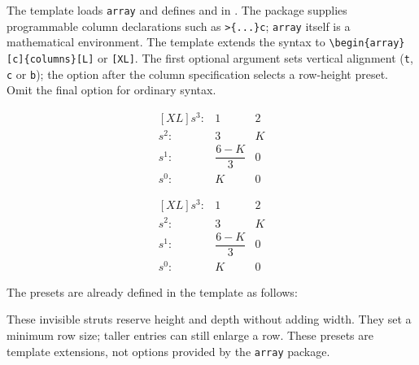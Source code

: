 \begin{referencecode}
\usepackage{uc3m-report}
\end{referencecode}
The template loads \texttt{array} and defines \texttt{\string\rowL}
and \texttt{\string\rowXL} in
. The package supplies
programmable column declarations such as \verb|>{...}c|;
\texttt{array} itself is a mathematical environment.
The template extends the syntax to
\verb|\begin{array}[c]{columns}[L]| or \texttt{[XL]}.
The first optional argument sets vertical alignment (\texttt{t},
\texttt{c} or \texttt{b}); the option after the column specification
selects a row-height preset. Omit the final option for ordinary syntax.
\begin{referencecode}
\[
\begin{array}{rcc}[XL]
    s^3: & 1 & 2 \\
    s^2: & 3 & K \\
    s^1: & \dfrac{6-K}{3} & 0 \\
    s^0: & K & 0
\end{array}
\]
\end{referencecode}

\[
\begin{array}{rcc}[XL]
    s^3: & 1 & 2 \\
    s^2: & 3 & K \\
    s^1: & \dfrac{6-K}{3} & 0 \\
    s^0: & K & 0
\end{array}
\]

The presets are already defined in the template as follows:
\begin{referencecode}
\newcommand{\rowL}{\vphantom{\dfrac{M}{M}}}
\newcommand{\rowXL}{\vphantom{\dfrac{M^M}{M_M}}}
\end{referencecode}
These invisible struts reserve
height and depth without adding width. They set a minimum row size;
taller entries can still enlarge a row. These presets are template
extensions, not options provided by the \texttt{array} package.

